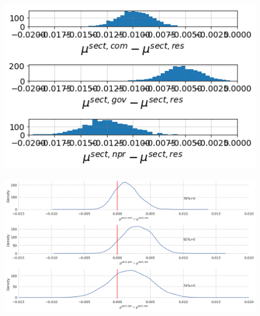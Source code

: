 \documentclass[a4paper]{article}
\begin{document}


\begin{figure} [!htb]
\begin{minipage}{.48\textwidth}
  \centering
  \includegraphics[width=1\linewidth]{figures/mu_sectors.png}
  \label{fig:mu_sectors}
 \end{minipage}\qquad
\begin{minipage}{.48\textwidth}
  \centering
  \includegraphics[width=1\linewidth]{figures/mu_sectors_const.png}
  \label{fig:mu_sectors_const}
 \end{minipage}

\bigskip


\end{figure}
\end{document}
